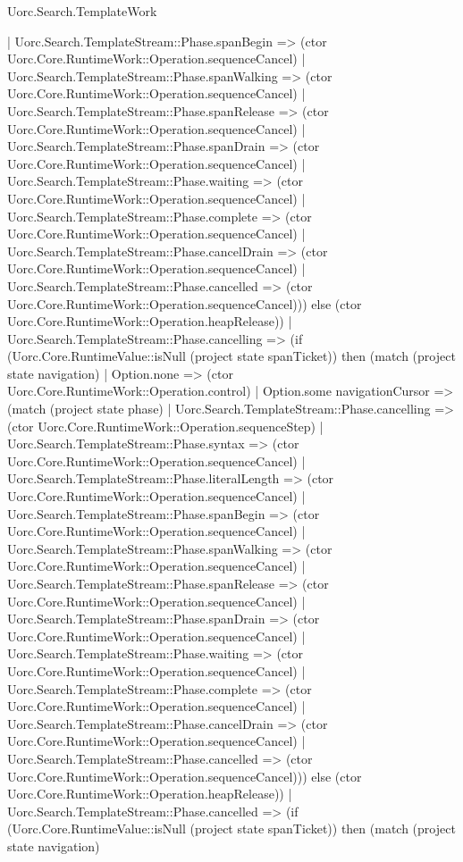 \begin{lexlean}{Uorc.Search.TemplateWork}
\begin{semanticmodule}
{        | Uorc.Search.TemplateStream::Phase.spanBegin => (ctor Uorc.Core.RuntimeWork::Operation.sequenceCancel)
        | Uorc.Search.TemplateStream::Phase.spanWalking => (ctor Uorc.Core.RuntimeWork::Operation.sequenceCancel)
        | Uorc.Search.TemplateStream::Phase.spanRelease => (ctor Uorc.Core.RuntimeWork::Operation.sequenceCancel)
        | Uorc.Search.TemplateStream::Phase.spanDrain => (ctor Uorc.Core.RuntimeWork::Operation.sequenceCancel)
        | Uorc.Search.TemplateStream::Phase.waiting => (ctor Uorc.Core.RuntimeWork::Operation.sequenceCancel)
        | Uorc.Search.TemplateStream::Phase.complete => (ctor Uorc.Core.RuntimeWork::Operation.sequenceCancel)
        | Uorc.Search.TemplateStream::Phase.cancelDrain => (ctor Uorc.Core.RuntimeWork::Operation.sequenceCancel)
        | Uorc.Search.TemplateStream::Phase.cancelled => (ctor Uorc.Core.RuntimeWork::Operation.sequenceCancel))) else (ctor Uorc.Core.RuntimeWork::Operation.heapRelease))
    | Uorc.Search.TemplateStream::Phase.cancelling => (if (Uorc.Core.RuntimeValue::isNull (project state spanTicket)) then (match (project state navigation)
      | Option.none => (ctor Uorc.Core.RuntimeWork::Operation.control)
      | Option.some navigationCursor => (match (project state phase)
        | Uorc.Search.TemplateStream::Phase.cancelling => (ctor Uorc.Core.RuntimeWork::Operation.sequenceStep)
        | Uorc.Search.TemplateStream::Phase.syntax => (ctor Uorc.Core.RuntimeWork::Operation.sequenceCancel)
        | Uorc.Search.TemplateStream::Phase.literalLength => (ctor Uorc.Core.RuntimeWork::Operation.sequenceCancel)
        | Uorc.Search.TemplateStream::Phase.spanBegin => (ctor Uorc.Core.RuntimeWork::Operation.sequenceCancel)
        | Uorc.Search.TemplateStream::Phase.spanWalking => (ctor Uorc.Core.RuntimeWork::Operation.sequenceCancel)
        | Uorc.Search.TemplateStream::Phase.spanRelease => (ctor Uorc.Core.RuntimeWork::Operation.sequenceCancel)
        | Uorc.Search.TemplateStream::Phase.spanDrain => (ctor Uorc.Core.RuntimeWork::Operation.sequenceCancel)
        | Uorc.Search.TemplateStream::Phase.waiting => (ctor Uorc.Core.RuntimeWork::Operation.sequenceCancel)
        | Uorc.Search.TemplateStream::Phase.complete => (ctor Uorc.Core.RuntimeWork::Operation.sequenceCancel)
        | Uorc.Search.TemplateStream::Phase.cancelDrain => (ctor Uorc.Core.RuntimeWork::Operation.sequenceCancel)
        | Uorc.Search.TemplateStream::Phase.cancelled => (ctor Uorc.Core.RuntimeWork::Operation.sequenceCancel))) else (ctor Uorc.Core.RuntimeWork::Operation.heapRelease))
    | Uorc.Search.TemplateStream::Phase.cancelled => (if (Uorc.Core.RuntimeValue::isNull (project state spanTicket)) then (match (project state navigation)
}
\end{semanticmodule}
\end{lexlean}
